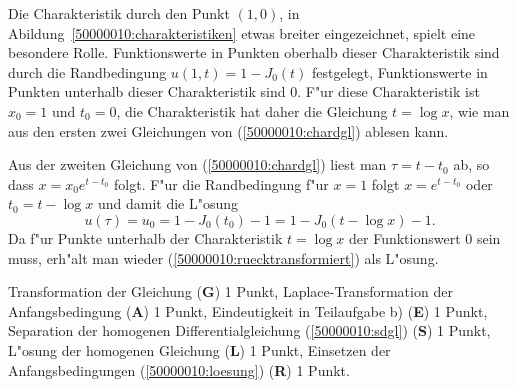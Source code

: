 \begin{diskussion}
Die Charakteristik durch den Punkt $(1,0)$, in Abildung~\ref{50000010:charakteristiken} etwas breiter eingezeichnet, spielt eine besondere Rolle.
Funktionswerte in Punkten oberhalb dieser Charakteristik sind durch die 
Randbedingung $u(1,t)=1-J_0(t)$ festgelegt, Funktionswerte in Punkten
unterhalb dieser Charakteristik sind $0$.
F"ur diese Charakteristik ist $x_0=1$ und $t_0=0$, die Charakteristik
hat daher die Gleichung $t=\log x$, wie man aus den ersten zwei Gleichungen
von (\ref{50000010:chardgl}) ablesen kann.

Aus der zweiten Gleichung von (\ref{50000010:chardgl})
liest man $\tau=t-t_0$ ab, so dass 
$x=x_0e^{t-t_0}$ folgt.
F"ur die Randbedingung f"ur $x=1$ folgt $x=e^{t-t_0}$
oder $t_0=t-\log x$ und damit die L"osung 
\[
u(\tau)=u_0=1-J_0(t_0)-1=1-J_0(t-\log x)-1.
\]
Da f"ur Punkte unterhalb der Charakteristik $t=\log x$ der Funktionswert $0$
sein muss, erh"alt man wieder (\ref{50000010:ruecktransformiert}) als L"osung.
\end{diskussion}

\begin{bewertung}
Transformation der Gleichung ({\bf G}) 1 Punkt,
Laplace-Transformation der Anfangsbedingung ({\bf A}) 1 Punkt,
Eindeutigkeit in Teilaufgabe b) ({\bf E}) 1 Punkt,
Separation der homogenen Differentialgleichung (\ref{50000010:sdgl})
({\bf S}) 1 Punkt,
L"osung der homogenen Gleichung ({\bf L}) 1 Punkt,
Einsetzen der Anfangsbedingungen (\ref{50000010:loesung}) ({\bf R}) 1 Punkt.
\end{bewertung}




